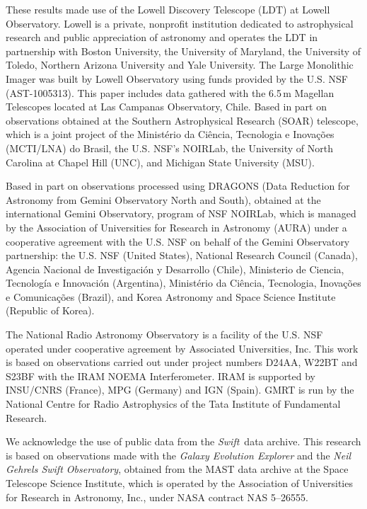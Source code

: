 \documentclass[twocolumn,twocolappendix, linenumbers, trackchanges]{aastex7}
\newcommand{\swift}{\emph{Swift}}
\begin{document}
These results made use of the Lowell Discovery Telescope (LDT) at Lowell Observatory.  Lowell is a private, nonprofit institution dedicated to astrophysical research and public appreciation of astronomy and operates the LDT in partnership with Boston University, the University of Maryland, the University of Toledo, Northern Arizona University and Yale University.  The Large Monolithic Imager was built by Lowell Observatory using funds provided by the U.S. NSF (AST-1005313).
%
This paper includes data gathered with the 6.5\,m Magellan Telescopes located at Las Campanas Observatory, Chile. %
%
Based in part on observations obtained at the Southern Astrophysical Research (SOAR) telescope, which is a joint project of the Minist\'{e}rio da Ci\^{e}ncia, Tecnologia e Inova\c{c}\~{o}es (MCTI/LNA) do Brasil, the U.S. NSF's NOIRLab, the University of North Carolina at Chapel Hill (UNC), and Michigan State University (MSU).

Based in part on observations processed using DRAGONS (Data Reduction for Astronomy from Gemini Observatory North and South), obtained at the international Gemini Observatory, program of NSF NOIRLab,  which is managed by the Association of Universities for Research in Astronomy (AURA) under a cooperative agreement with the U.S. NSF on behalf of the Gemini Observatory partnership: the U.S. NSF (United States), National Research Council (Canada), Agencia Nacional de Investigaci\'{o}n y Desarrollo (Chile), Ministerio de Ciencia, Tecnolog\'{i}a e Innovaci\'{o}n (Argentina), Minist\'{e}rio da Ci\^{e}ncia, Tecnologia, Inova\c{c}\~{o}es e Comunica\c{c}\~{o}es (Brazil), and Korea Astronomy and Space Science Institute (Republic of Korea).

The National Radio Astronomy Observatory is a facility of the U.S. NSF operated under cooperative agreement by Associated Universities, Inc.
%
This work is based on observations carried out under project numbers D24AA, W22BT and S23BF with the IRAM NOEMA Interferometer. IRAM is supported by INSU/CNRS (France), MPG (Germany) and IGN (Spain).
%
GMRT is run by the National Centre for Radio Astrophysics of the Tata Institute of Fundamental Research.


We acknowledge the use of public data from the \swift\  data archive.
%
This research is based on observations made with the {\em Galaxy Evolution Explorer} and the {\em Neil Gehrels Swift Observatory}, obtained from the MAST data archive at the Space Telescope Science Institute, which is operated by the Association of Universities for Research in Astronomy, Inc., under NASA contract NAS 5–26555.
\end{document}
